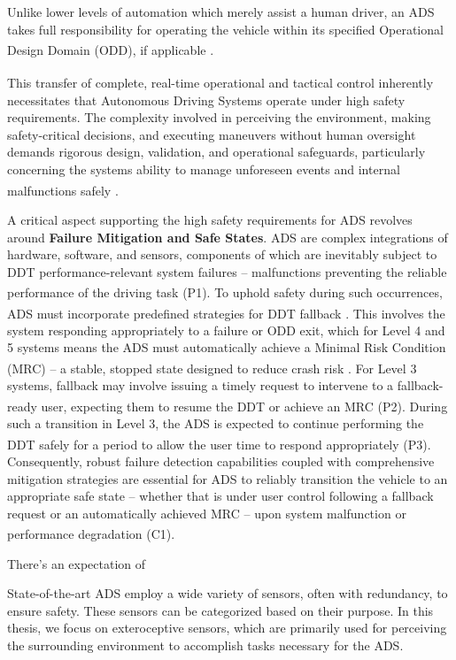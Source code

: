 Unlike
lower levels of automation which merely assist a human driver, an ADS
takes full responsibility for operating the vehicle within its specified
Operational Design Domain (ODD), if applicable{ \textsuperscript{} }.

This transfer of complete, real-time operational and tactical control {
\textsuperscript{} } inherently necessitates that Autonomous Driving
Systems operate under high safety requirements. The complexity involved
in perceiving the environment, making safety-critical decisions, and
executing maneuvers without human oversight demands rigorous design,
validation, and operational safeguards, particularly concerning the
system\textquotesingle s ability to manage unforeseen events and
internal malfunctions safely{ \textsuperscript{} }. { ~ }

A critical aspect supporting the high safety requirements for ADS
revolves around \textbf{Failure Mitigation and Safe States}. ADS are
complex integrations of hardware, software, and sensors, components of
which are inevitably subject to DDT performance-relevant system failures
-- malfunctions preventing the reliable performance of the driving task
{ \textsuperscript{} } (P1). To uphold safety during such occurrences,
ADS must incorporate predefined strategies for DDT fallback{
\textsuperscript{} }. This involves the system responding appropriately
to a failure or ODD exit, which for Level 4 and 5 systems means the ADS
must automatically achieve a Minimal Risk Condition (MRC) -- a stable,
stopped state designed to reduce crash risk{ \textsuperscript{} }. For
Level 3 systems, fallback may involve issuing a timely request to
intervene to a fallback-ready user, expecting them to resume the DDT or
achieve an MRC { \textsuperscript{} } (P2). During such a transition in
Level 3, the ADS is expected to continue performing the DDT safely for a
period to allow the user time to respond appropriately {
\textsuperscript{} } (P3). Consequently, robust failure detection
capabilities coupled with comprehensive mitigation strategies are
essential for ADS to reliably transition the vehicle to an appropriate
safe state -- whether that is under user control following a fallback
request or an automatically achieved MRC -- upon system malfunction or
performance degradation { \textsuperscript{} } (C1). { }


There's an expectation of 

State-of-the-art ADS employ a wide variety of sensors, often with redundancy, to ensure safety. These sensors can be categorized based on their purpose. In this thesis, we focus on exteroceptive sensors, which are primarily used for perceiving the surrounding environment to accomplish tasks necessary for the ADS.





